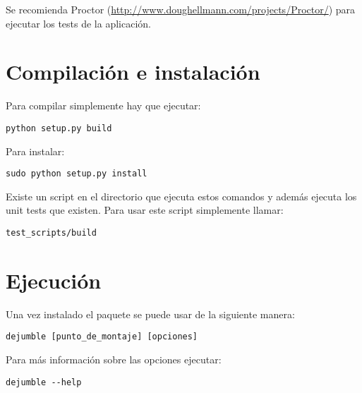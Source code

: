 Se recomienda Proctor (\url{http://www.doughellmann.com/projects/Proctor/}) para ejecutar los tests de la aplicación.

\section{Compilación e instalación}

Para compilar simplemente hay que ejecutar:

\begin{verbatim}
python setup.py build
\end{verbatim}

Para instalar:

\begin{verbatim}
sudo python setup.py install
\end{verbatim}

Existe un script en el directorio  que ejecuta estos comandos y además ejecuta los unit tests que existen. Para usar este script simplemente llamar:

\begin{verbatim}
test_scripts/build
\end{verbatim}


\section{Ejecución}

Una vez instalado el paquete se puede usar de la siguiente manera:

\begin{verbatim}
dejumble [punto_de_montaje] [opciones]
\end{verbatim}

Para más información sobre las opciones ejecutar:

\begin{verbatim}
dejumble --help
\end{verbatim}



